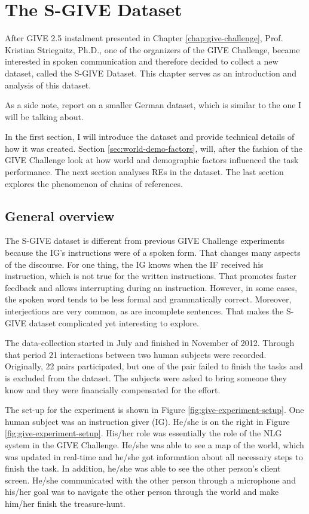 \chapter{The S-GIVE Dataset}
After GIVE 2.5 instalment presented in Chapter \ref{chap:give-challenge}, Prof. Kristina Striegnitz, Ph.D., one of the organizers of the GIVE Challenge, became interested in spoken communication and therefore decided to collect a new dataset, called the S-GIVE Dataset. This chapter serves as an introduction and analysis of this dataset.

As a side note, \citet{striegnitz2012referring} report on a smaller German dataset, which is similar to the one I will be talking about. 

In the first section, I will introduce the dataset and provide technical details of how it was created. Section \ref{sec:world-demo-factors}, will, after the fashion of the GIVE Challenge look at how world and demographic factors influenced the task performance. The next section analyses REs in the dataset. The last section explores the phenomenon of chains of references.

\section{General overview}
\label{sec:general-overview}
The S-GIVE dataset is different from previous GIVE Challenge experiments because the IG's instructions were of a spoken form. That changes many aspects of the discourse. For one thing, the IG knows when the IF received his instruction, which is not true for the written instructions. That promotes faster feedback and allows interrupting during an instruction. However, in some cases, the spoken word tends to be less formal and grammatically correct. Moreover, interjections are very common, as are incomplete sentences. That makes the S-GIVE dataset complicated yet interesting to explore.

The data-collection started in July and finished in November of 2012. Through that period 21 interactions between two human subjects were recorded. Originally, 22 pairs participated, but one of the pair failed to finish the tasks and is excluded from the dataset. The subjects were asked to bring someone they know and they were financially compensated for the effort. 

The set-up for the experiment is shown in Figure \ref{fig:give-experiment-setup}. One human subject was an instruction giver (IG). He/she is on the right in Figure \ref{fig:give-experiment-setup}. His/her role was essentially the role of the NLG system in the GIVE Challenge. He/she was able to see a map of the world, which was updated in real-time and he/she got information about all necessary steps to finish the task. In addition, he/she was able to see the other person's client screen. He/she communicated with the other person through a microphone and his/her goal was to navigate the other person through the world and make him/her finish the treasure-hunt.

